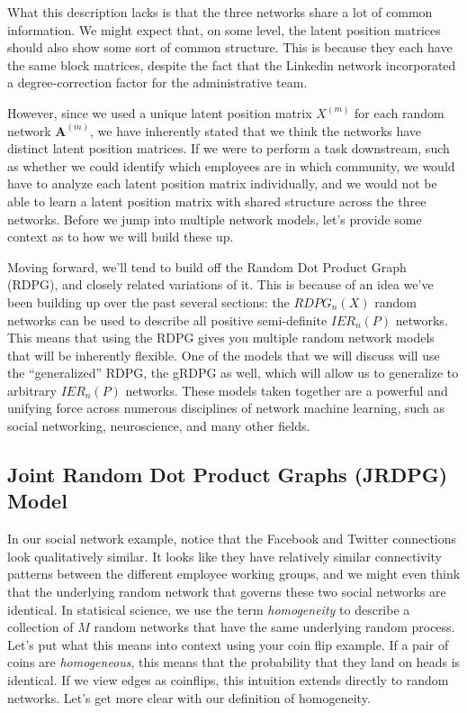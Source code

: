 What this description lacks is that the three networks share a {lot} of common information. We might expect that, on some level, the latent position matrices should also show some sort of common structure. This is because they each have the same block matrices, despite the fact that the Linkedin network incorporated a degree-correction factor for the administrative team.

However, since we used a {unique} latent position matrix $X^{(m)}$ for each random network $\mathbf A^{(m)}$, we have inherently stated that we think the networks have distinct latent position matrices. If we were to perform a task downstream, such as whether we could identify which employees are in which community, we would have to analyze each latent position matrix individually, and we would not be able to learn a latent position matrix with shared structure across the three networks. Before we jump into multiple network models, let's provide some context as to how we will build these up.

Moving forward, we'll tend to build off the Random Dot Product Graph (RDPG), and closely related variations of it. This is because of an idea we've been building up over the past several sections: the $RDPG_n(X)$ random networks can be used to describe all positive semi-definite $IER_n(P)$ networks. This means that using the RDPG gives you multiple random network models that will be inherently flexible. One of the models that we will discuss will use the ``generalized'' RDPG, the gRDPG \cite{Rubin2022Sep,Arroyo2021} as well, which will allow us to generalize to arbitrary $IER_n(P)$ networks. These models taken together are a powerful and unifying force across numerous disciplines of network machine learning, such as social networking, neuroscience, and many other fields.

\subsection{Joint Random Dot Product Graphs (JRDPG) Model}
\label{sec:ch5:multi:jrdpg}
In our social network example, notice that the Facebook and Twitter connections look qualitatively similar. It looks like they have relatively similar connectivity patterns between the different employee working groups, and we might even think that the underlying random network that governs these two social networks are {identical}. In statisical science, we use the term \textit{homogeneity} to describe a collection of $M$ random networks that have the same underlying random process. Let's put what this means into context using your coin flip example. If a pair of coins are \textit{homogeneous}, this means that the probability that they land on heads is identical. If we view edges as coinflips, this intuition extends directly to random networks. Let's get more clear with our definition of homogeneity.

